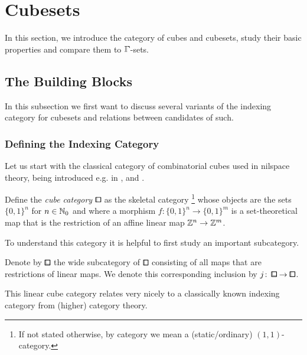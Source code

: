 
\section{Cubesets}
In this section, we introduce the category of cubes and cubesets, study their basic properties and compare them to $\bbGamma$-sets.



\subsection{The Building Blocks}\label{ssec:index-cats}

In this subsection we first want to discuss several variants of the indexing category for cubesets and relations between candidates of such.

\subsubsection{Defining the Indexing Category}

Let us start with the classical category of combinatorial cubes used in nilspace theory, being introduced e.g. in \cite[p. 3]{Camarena2010}, \cite[Definition 3.1]{Gutman2020} and \cite[Definition 1.1.1]{Candela2017}.

\begin{definition}\label{def:cube_cat}
Define the \emph{cube category $\bbox$} as the skeletal category%
\footnote{If not stated otherwise, by category we mean a (static/ordinary) $(1,1)$-category.}
whose objects are the sets $\{0,1\}^n$ for $n\in{\mathbb{N}}_0$ and where a morphism $f\colon\{0,1\}^n\to\{0,1\}^m$
is a set-theoretical map that is the restriction of an affine linear map $\mathbb{Z}^n\to\mathbb{Z}^m$.
\end{definition}

To understand this category it is helpful to first study an important subcategory.

\begin{definition}\label{def:linear_cubes}
Denote by $\bblox$ the wide subcategory of $\bbox$ consisting of all maps that are restrictions of linear maps.
We denote this corresponding inclusion by $j\colon\bblox\to\bbox$.
\end{definition}

This linear cube category relates very nicely to a classically known indexing category from (higher) category theory.

